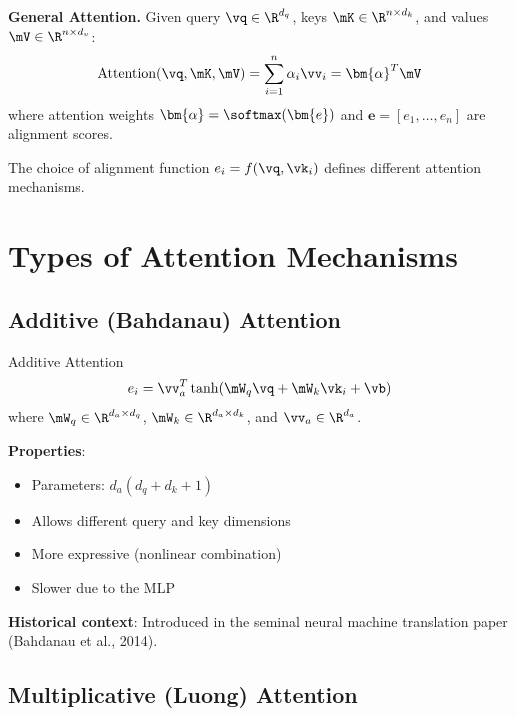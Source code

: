 \textbf{General Attention.}
Given query $\vq \in \R^{d_q}$, keys $\mK \in \R^{n \times d_k}$, and values $\mV \in \R^{n \times d_v}$:
\begin{equation}
\text{Attention}(\vq, \mK, \mV) = \sum_{i=1}^{n} \alpha_i \vv_i = \bm{\alpha}^T \mV
\end{equation}
where attention weights $\bm{\alpha} = \softmax(\bm{e})$ and $\bm{e} = [e_1, \ldots, e_n]$ are alignment scores.

The choice of alignment function $e_i = f(\vq, \vk_i)$ defines different attention mechanisms.

\section{Types of Attention Mechanisms}
\label{sec:attention_types}

\subsection{Additive (Bahdanau) Attention}

\begin{mathresult}{Additive Attention}
\begin{equation}
e_i = \vv_a^T \tanh(\mW_q \vq + \mW_k \vk_i + \vb)
\end{equation}
where $\mW_q \in \R^{d_a \times d_q}$, $\mW_k \in \R^{d_a \times d_k}$, and $\vv_a \in \R^{d_a}$.
\end{mathresult}

\textbf{Properties}:
\begin{itemize}
    \item Parameters: $d_a(d_q + d_k + 1)$
    \item Allows different query and key dimensions
    \item More expressive (nonlinear combination)
    \item Slower due to the MLP
\end{itemize}

\textbf{Historical context}: Introduced in the seminal neural machine translation paper (Bahdanau et al., 2014).

\subsection{Multiplicative (Luong) Attention}

